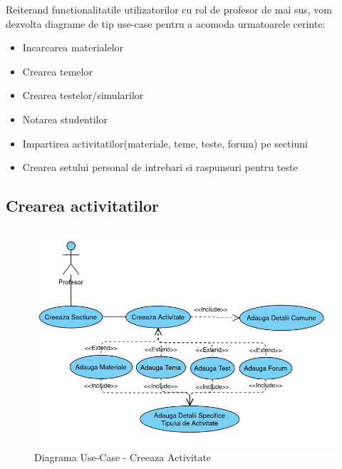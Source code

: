 \documentclass[12pt, a4paper, oneside, romanian]{teza-upb}
\begin{document}
Reiterand functionalitatile utilizatorilor cu rol de profesor de mai sus, vom dezvolta diagrame de tip use-case pentru a acomoda urmatoarele cerinte:
\begin{itemize}
	\item Incarcarea materialelor
	\item Crearea temelor
	\item Crearea testelor/simularilor
	\item Notarea studentilor
	\item Impartirea activitatilor(materiale, teme, teste, forum) pe sectiuni
	\item Crearea setului personal de intrebari si raspunsuri pentru teste
\end{itemize}

\subsection{Crearea activitatilor}

\begin{figure}[H]
\centering
\includegraphics*[width=0.9\columnwidth]{diagrama-use-case-creeaza-activitate}
\caption{Diagrama Use-Case - Creeaza Activitate}
\label{diagrama-use-case-creeaza-activitate}
\end{figure}
\end{document}
